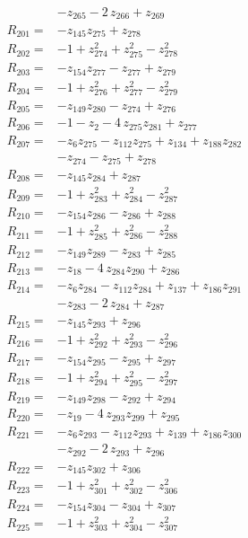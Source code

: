 \begin{align*}
&-z_{265} -2\,z_{266} +z_{269}\\[2pt]
R_{201}={}&-z_{145}z_{275} +z_{278}\\[2pt]
R_{202}={}&-1 +z_{274}^{2} +z_{275}^{2} -z_{278}^{2}\\[2pt]
R_{203}={}&-z_{154}z_{277} -z_{277} +z_{279}\\[2pt]
R_{204}={}&-1 +z_{276}^{2} +z_{277}^{2} -z_{279}^{2}\\[2pt]
R_{205}={}&-z_{149}z_{280} -z_{274} +z_{276}\\[2pt]
R_{206}={}&-1 -z_{2} -4\,z_{275}z_{281} +z_{277}\\[2pt]
R_{207}={}&-z_{6}z_{275} -z_{112}z_{275} +z_{134} +z_{188}z_{282}\\
&-z_{274} -z_{275} +z_{278}\\[2pt]
R_{208}={}&-z_{145}z_{284} +z_{287}\\[2pt]
R_{209}={}&-1 +z_{283}^{2} +z_{284}^{2} -z_{287}^{2}\\[2pt]
R_{210}={}&-z_{154}z_{286} -z_{286} +z_{288}\\[2pt]
R_{211}={}&-1 +z_{285}^{2} +z_{286}^{2} -z_{288}^{2}\\[2pt]
R_{212}={}&-z_{149}z_{289} -z_{283} +z_{285}\\[2pt]
R_{213}={}&-z_{18} -4\,z_{284}z_{290} +z_{286}\\[2pt]
R_{214}={}&-z_{6}z_{284} -z_{112}z_{284} +z_{137} +z_{186}z_{291}\\
&-z_{283} -2\,z_{284} +z_{287}\\[2pt]
R_{215}={}&-z_{145}z_{293} +z_{296}\\[2pt]
R_{216}={}&-1 +z_{292}^{2} +z_{293}^{2} -z_{296}^{2}\\[2pt]
R_{217}={}&-z_{154}z_{295} -z_{295} +z_{297}\\[2pt]
R_{218}={}&-1 +z_{294}^{2} +z_{295}^{2} -z_{297}^{2}\\[2pt]
R_{219}={}&-z_{149}z_{298} -z_{292} +z_{294}\\[2pt]
R_{220}={}&-z_{19} -4\,z_{293}z_{299} +z_{295}\\[2pt]
R_{221}={}&-z_{6}z_{293} -z_{112}z_{293} +z_{139} +z_{186}z_{300}\\
&-z_{292} -2\,z_{293} +z_{296}\\[2pt]
R_{222}={}&-z_{145}z_{302} +z_{306}\\[2pt]
R_{223}={}&-1 +z_{301}^{2} +z_{302}^{2} -z_{306}^{2}\\[2pt]
R_{224}={}&-z_{154}z_{304} -z_{304} +z_{307}\\[2pt]
R_{225}={}&-1 +z_{303}^{2} +z_{304}^{2} -z_{307}^{2}\\[2pt]

\end{align*}
